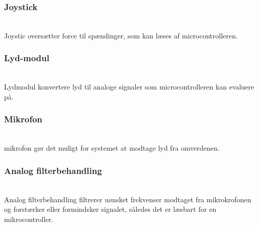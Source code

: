 \subsubsection*{\textbf{Joystick}}\hfill\\
Joystic oversætter force til spændinger, som kan læses af microcontrolleren.
\subsubsection*{\textbf{Lyd-modul}}\hfill\\
Lydmodul konvertere lyd til analoge signaler som microcontrolleren kan evaluere på.
\subsubsection*{\textbf{Mikrofon}}\hfill\\
mikrofon gør det muligt for systemet at modtage lyd fra omverdenen.
\subsubsection*{\textbf{Analog filterbehandling}}\hfill\\
Analog filterbehandling filtrerer uønsket frekvenser modtaget fra mikrokrofonen og forstærker eller formindsker signalet, således det er læsbart for en mikrocontroller.


